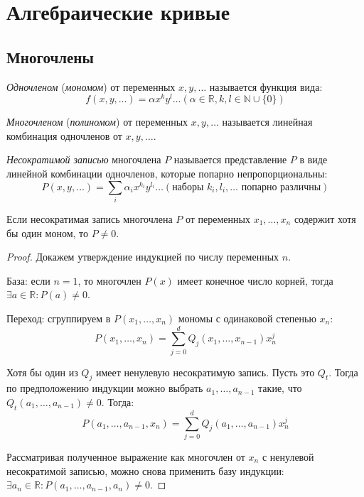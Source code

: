 \section{Алгебраические кривые}

\subsection{Многочлены}

\begin{definition}
	\textit{Одночленом} (\textit{мономом}) от переменных $x, y, \dots$ называется функция вида:
	\[f(x, y, \dots) = \alpha x^ky^l\dots (\alpha \in \mathbb{R}, k, l \in \mathbb{N} \cup \{0\})\]
\end{definition}

\begin{definition}
	\textit{Многочленом} (\textit{полиномом}) от переменных $x, y, \dots$ называется линейная комбинация одночленов от $x, y, \dots$.
\end{definition}

\begin{definition}
	\textit{Несократимой записью} многочлена $P$ называется представление $P$ в виде линейной комбинации одночленов, которые попарно непропорциональны:
	\[P(x,y,\dots) = \sum_{i}\alpha_ix^{k_i}y^{l_i}\dots (\text{наборы } k_i, l_i, \dots \text{ попарно различны})\]
\end{definition}

\begin{proposition}
	Если несократимая запись многочлена $P$ от переменных $x_1, \dots, x_n$ содержит хотя бы один моном, то $P \ne 0$.
\end{proposition}

\begin{proof}
	Докажем утверждение индукцией по числу переменных $n$.
	
	База: если $n = 1$, то многочлен $P(x)$ имеет конечное число корней, тогда $\exists a \in \mathbb{R}: P(a) \ne 0$.
	
	Переход: сгруппируем в $P(x_1, \dots, x_n)$ мономы с одинаковой степенью $x_n$:
	\[P(x_1, \dots, x_n) = \sum_{j = 0}^dQ_j(x_1,\dots, x_{n-1})x_n^j\]
	
	Хотя бы один из $Q_j$ имеет ненулевую несократимую запись. Пусть это $Q_t$. Тогда по предположению индукции можно выбрать $a_1,\dots,a_{n-1}$ такие, что $Q_t(a_1, \dots, a_{n-1}) \ne 0$. Тогда:
	\[P(a_1, \dots, a_{n-1}, x_n) = \sum_{j = 0}^dQ_j(a_1,\dots,a_{n-1})x_n^j\]
	
	Рассматривая полученное выражение как многочлен от $x_n$ с ненулевой несократимой записью, можно снова применить базу индукции: $\exists a_n \in \mathbb{R}:P(a_1, \dots, a_{n-1}, a_n) \ne 0$.
\end{proof}


